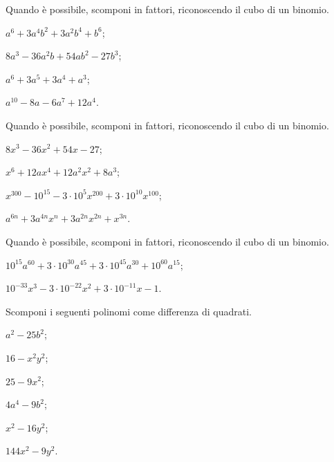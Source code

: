 \begin{esercizio}[\Ast]
\label{ese:13.57}
Quando è possibile, scomponi in fattori, riconoscendo il cubo di un binomio.
\begin{multicols}{2}
\begin{enumeratea}
 \item $a^{6}+3a^{4}b^{2}+3a^{2}b^{4}+b^{6}$;
 \item $8a^{3}-36a^{2}b+54ab^{2}-27b^{3}$;
 \item $a^{6}+3a^{5}+3a^{4}+a^{3}$;
 \item $a^{10}-8a-6a^{7}+12a^{4}$.%
\end{enumeratea}
\end{multicols}
\end{esercizio}

\begin{esercizio}
\label{ese:13.58}
Quando è possibile, scomponi in fattori, riconoscendo il cubo di un binomio.
\begin{multicols}{2}
\begin{enumeratea}
 \item $8x^{3}-36x^{2}+54x-27$;
 \item $x^{6}+12ax^{4}+12a^{2}x^{2}+8a^{3}$;
 \item $x^{300}-10^{15}-3\cdot 10^{5}x^{200}+3\cdot 10^{10}x^{100}$;
 \item $a^{6n}+3a^{4n}x^{n}+3a^{2n}x^{2n}+x^{3n}$.
\end{enumeratea}
\end{multicols}
\end{esercizio}

\begin{esercizio}
\label{ese:13.59}
Quando è possibile, scomponi in fattori, riconoscendo il cubo di un binomio.
\begin{enumeratea}
 \item $10^{15}a^{60}+3\cdot 10^{30}a^{45}+3\cdot 10^{45}a^{30}+10^{60}a^{15}$;
 \item $10^{-33}x^{3}-3\cdot 10^{-22}x^{2}+3\cdot 10^{-11}x-1$.
\end{enumeratea}
\end{esercizio}
\pagebreak
\begin{esercizio}
\label{ese:13.60}
Scomponi i seguenti polinomi come differenza di quadrati.
\begin{multicols}{3}
\begin{enumeratea}
 \item $a^{2}-25b^{2}$;
 \item $16-x^{2}y^{2}$;
 \item $25-9x^{2}$;
 \item $4a^{4}-9b^{2}$;
 \item $x^{2}-16y^{2}$;
 \item $144x^{2}-9y^{2}$.
\end{enumeratea}
\end{multicols}
\end{esercizio}

